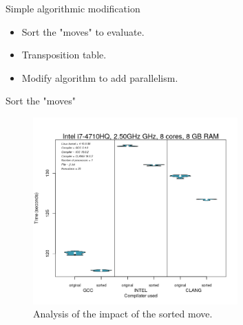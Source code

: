 \documentclass{beamer}
\begin{document}
\begin{frame}{Simple algorithmic modification}

\begin{itemize}
  \item
  Sort the "moves" to evaluate.
  \item
  Transposition table.
  \item
  Modify algorithm to add parallelism.
 \end{itemize}	
\end{frame}

\begin{frame}{Sort the "moves"}
	\begin{figure}
      \includegraphics[width=0.7\textwidth]{trie.png}
      \caption{Analysis of the impact of the sorted move.\label{Fig:trie}}
	\end{figure}
\end{frame}
\end{document}
